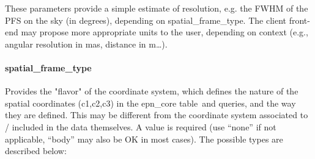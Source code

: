\documentclass[11pt,a4paper]{ivoa}
\begin{document}
These parameters provide a simple estimate of resolution, e.g. the FWHM of the PFS on the sky (in degrees), depending on spatial\_frame\_type. The client front-end may propose more appropriate units to the user, depending on context (e.g., angular resolution in mas, distance in m…).

\paragraph{spatial\_frame\_type}

Provides the "flavor" of the coordinate system, which defines the nature of the spatial coordinates (c1,c2,c3) in the epn\_core table and queries, and the way they are defined. This may be different from the coordinate system associated to / included in the data themselves. A value is required (use ``none'' if not applicable, ``body'' may also be OK in most cases). The possible types are described below:
\end{document}
